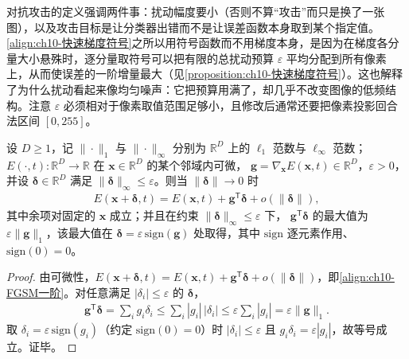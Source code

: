 \documentclass[../../main.tex]{subfiles}
\begin{document}
\begin{remark}
对抗攻击的定义强调两件事：扰动幅度要小（否则不算“攻击”而只是换了一张图），以及攻击目标是让分类器出错而不是让误差函数本身取到某个指定值。\eqref{align:ch10-快速梯度符号}之所以用符号函数而不用梯度本身，是因为在梯度各分量大小悬殊时，逐分量取符号可以把有限的总扰动预算 $\varepsilon$ 平均分配到所有像素上，从而使误差的一阶增量最大（见\cref{proposition:ch10-快速梯度符号}）。这也解释了为什么扰动看起来像均匀噪声：它把预算用满了，却几乎不改变图像的低频结构。注意 $\varepsilon$ 必须相对于像素取值范围足够小，且修改后通常还要把像素投影回合法区间 $[0,255]$。
\end{remark}

\begin{proposition}[快速梯度符号法的一阶效应]\label{proposition:ch10-快速梯度符号}
设 $D\geqslant1$，记 $\|\cdot\|_{1}$ 与 $\|\cdot\|_{\infty}$ 分别为
$\mathbb{R}^{D}$ 上的 $\ell_{1}$ 范数与 $\ell_{\infty}$ 范数；
$E(\cdot,t):\mathbb{R}^{D}\to\mathbb{R}$ 在
$\mathbf{x}\in\mathbb{R}^{D}$ 的某个邻域内可微，
$\mathbf{g}=\nabla_{\mathbf{x}}E(\mathbf{x},t)\in\mathbb{R}^{D}$，$\varepsilon>0$，
并设 $\boldsymbol{\delta}\in\mathbb{R}^{D}$ 满足
$\|\boldsymbol{\delta}\|_{\infty}\leqslant\varepsilon$。则当
$\|\boldsymbol{\delta}\|\to0$ 时
\begin{align}
  E(\mathbf{x}+\boldsymbol{\delta},t)=E(\mathbf{x},t)
  +\mathbf{g}^{\mathsf{T}}\boldsymbol{\delta}+o(\|\boldsymbol{\delta}\|),
  \label{align:ch10-FGSM一阶}
\end{align}
其中余项对固定的 $\mathbf{x}$ 成立；并且在约束
$\|\boldsymbol{\delta}\|_{\infty}\leqslant\varepsilon$ 下，
$\mathbf{g}^{\mathsf{T}}\boldsymbol{\delta}$ 的最大值为
$\varepsilon\|\mathbf{g}\|_{1}$，该最大值在
$\boldsymbol{\delta}=\varepsilon\,\mathrm{sign}(\mathbf{g})$ 处取得，其中
$\mathrm{sign}$ 逐元素作用、$\mathrm{sign}(0)=0$。
\end{proposition}
\begin{proof}
由可微性，$E(\mathbf{x}+\boldsymbol{\delta},t)=E(\mathbf{x},t)+\mathbf{g}^{\mathsf{T}}\boldsymbol{\delta}+o(\|\boldsymbol{\delta}\|)$，即\eqref{align:ch10-FGSM一阶}。对任意满足 $|\delta_i|\leqslant\varepsilon$ 的 $\boldsymbol{\delta}$，
\begin{align*}
  \mathbf{g}^{\mathsf{T}}\boldsymbol{\delta}=\sum_i g_i\delta_i\leqslant\sum_i |g_i|\,|\delta_i|\leqslant\varepsilon\sum_i|g_i|=\varepsilon\|\mathbf{g}\|_1 .
\end{align*}
取 $\delta_i=\varepsilon\,\mathrm{sign}(g_i)$（约定 $\mathrm{sign}(0)=0$）时 $|\delta_i|\leqslant\varepsilon$ 且 $g_i\delta_i=\varepsilon|g_i|$，故等号成立。证毕。
\end{proof}
\end{document}
